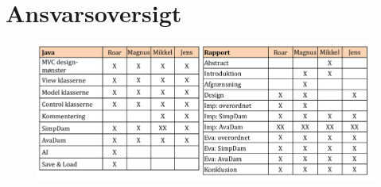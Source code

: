 \section{Ansvarsoversigt}
\vspace{-0.5cm}
\begin{figure}[H]
\centering
\includegraphics[width = 1.0\textwidth]{Figurer/ansvarsOversigt.pdf}
\label{fig:ansvarsOversigt}
    \end{figure}
    
\vspace{-0.5cm}